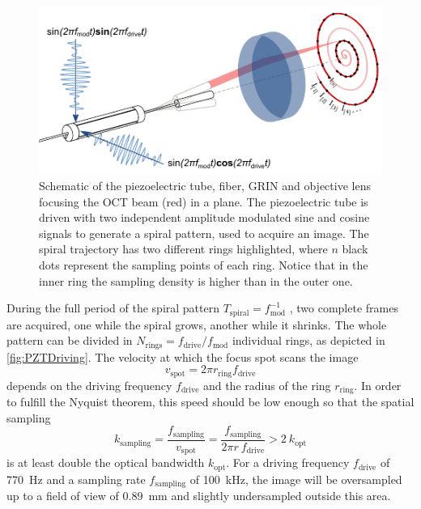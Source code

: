\documentclass[10pt]{iopart}
\begin{document}
\begin{figure}[h!]\centering \includegraphics[width=\columnwidth]{figures/PZTDrivingMoving.pdf}
      \caption{Schematic of the piezoelectric tube, fiber, GRIN and objective lens focusing the OCT beam (red) in a plane. 
      The piezoelectric tube is driven with two independent amplitude modulated sine and cosine signals to generate a spiral pattern, used to acquire an image. The spiral trajectory has two different rings highlighted, where $n$ black dots represent the sampling points of each ring. Notice that in the inner ring the sampling density is higher than in the outer one.
      }
      \label{fig:PZTDriving}
\end{figure}


During the full period of the spiral pattern $T_\mathrm{spiral}=f_\mathrm{mod}^{-1}$ , two complete frames are acquired, one while the spiral grows, another while it shrinks. The whole pattern can be divided in $N_\mathrm{rings} = f_\mathrm{drive}/f_\mathrm{mod}$ individual rings, as depicted in \autoref{fig:PZTDriving}. The velocity at which the focus spot scans the image
\begin{equation}
v_\mathrm{spot} = 2 \pi r_\mathrm{ring} f_\mathrm{drive}
\end{equation}
depends on the driving frequency $f_\mathrm{drive}$ and the radius of the ring $r_\mathrm{ring}$. In order to fulfill the Nyquist theorem, this speed should be low enough so that the spatial sampling 
\begin{equation}
k_\mathrm{sampling} = \frac{f_\mathrm{sampling}}{v_\mathrm{spot}} = \frac{f_\mathrm{sampling}}{ 2\pi r \ f_\mathrm{drive}  }> 2\ k_\mathrm{opt}
\end{equation}
is at least double the optical bandwidth $k_\mathrm{opt}$. For a driving frequency $f_\mathrm{drive}$ of \SI{770}{\hertz} and a sampling rate 
$f_\mathrm{sampling} $ of \SI{100}{\kilo\hertz}, the image will be oversampled up to a field of view of \SI{0.89}{\milli\meter} and slightly undersampled outside this area.
\end{document}
